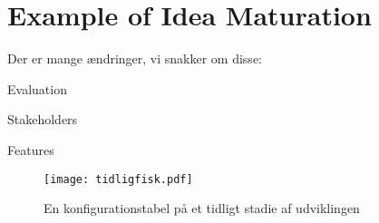 \section{Example of Idea Maturation}

Der er mange ændringer, vi snakker om disse:

Evaluation

Stakeholders

Features


\begin{figure}
	\texttt{[image: tidligfisk.pdf]}
	\caption{En konfigurationstabel på et tidligt stadie af udviklingen}
	\label{tab:tidligKonfigurationsTabel}
\end{figure}